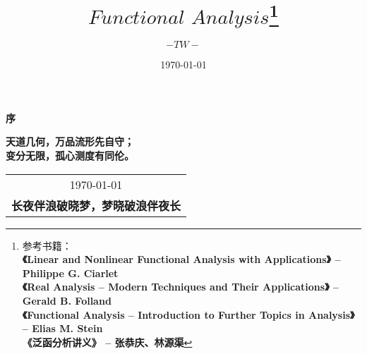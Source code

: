 \title{{\Huge{\textbf{$Functional \,\, Analysis$}}}\footnote{参考书籍：\\
			\hspace*{4em} \textbf{《Linear and Nonlinear Functional Analysis with Applications》 -- Philippe G. Ciarlet} \\
			\hspace*{4em} \textbf{《Real  Analysis -- Modern Techniques and Their Applications》 -- Gerald  B.  Folland} \\
			\hspace*{4em} \textbf{《Functional Analysis -- Introduction to Further Topics in Analysis》 -- Elias M. Stein} \\
			\hspace*{4em} \textbf{《泛函分析讲义》 -- 张恭庆、林源渠} 
			}}
\author{$-TW-$}
\date{\today}
\maketitle                   %

\thispagestyle{empty}        %
\begin{center}
	\Huge\textbf{序}
\end{center}


\vspace*{3em}
\begin{center}
	\large{\textbf{天道几何，万品流形先自守；}}\\
	
	\large{\textbf{变分无限，孤心测度有同伦。}}
\end{center}

\vspace*{3em}
\begin{flushright}
	\begin{tabular}{c}
		\today \\ \small{\textbf{长夜伴浪破晓梦，梦晓破浪伴夜长}}
	\end{tabular}
\end{flushright}


\newpage                      %
\pagestyle{plain}             %
\setcounter{page}{1}          %
\tableofcontents              %

\newpage                      %
\pagestyle{plain}
\setcounter{page}{1}          %
\setcounter{chapter}{0}    %